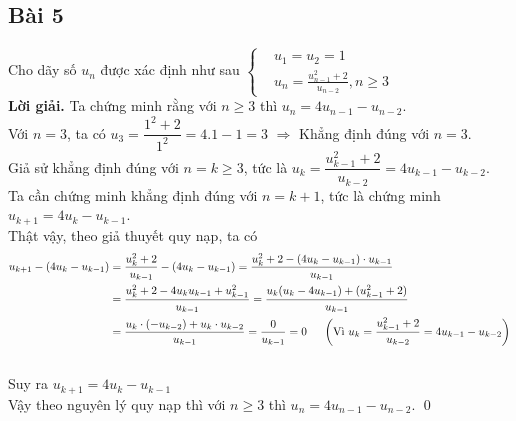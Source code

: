 \documentclass[a4paper,14pt]{article}
\begin{document}
    \subsection{Bài 5}
        Cho dãy số $u_n$ được xác định như sau  \(
                                                    \left\{
                                                        \begin{aligned}
                                                            &u_1=u_2=1
                                                            \\&u_n=\frac{u_{n-1}^2+2}{u_{n-2}}, n\geqslant 3
                                                        \end{aligned}
                                                    \right.
                                                \)
        \\
        \textbf{Lời giải.}
            Ta chứng minh rằng với $n\geqslant 3$ thì $u_n=4u_{n-1}-u_{n-2}$. \\
            Với $n=3$, ta có $u_3=\dfrac{1^2+2}{1^2}=4.1-1=3$ $\Rightarrow$ Khẳng định đúng với $n=3$. \\
            Giả sử khẳng định đúng với $n=k\geqslant 3$, tức là $u_k=\dfrac{u_{k-1}^2+2}{u_{k-2}}=4u_{k-1}-u_{k-2}$. \\
            Ta cần chứng minh khẳng định đúng với $n=k+1$, tức là chứng minh $u_{k+1}=4u_k-u_{k-1}$. \\
            Thật vậy, theo giả thuyết quy nạp, ta có
                \begin{align*}
                    u_{k+1}-(4u_k-u_{k-1})&=\frac{u_k^2+2}{u_{k-1}}-(4u_k-u_{k-1})
                    =\frac{u_k^2+2-(4u_k-u_{k-1})\cdot u_{k-1}}{u_{k-1}}
                    \\&=\frac{u_k^2+2-4u_ku_{k-1}+u_{k-1}^2}{u_{k-1}}
                    =\frac{u_k(u_k-4u_{k-1})+(u_{k-1}^2+2)}{u_{k-1}}
                    \\&=\frac{u_k\cdot(-u_{k-2})+u_k\cdot u_{k-2}}{u_{k-1}}=\frac{0}{u_{k-1}}=0 
                    \hspace{0.5cm}\left(\text{Vì }u_k=\dfrac{u_{k-1}^2+2}{u_{k-2}}=4u_{k-1}-u_{k-2}\right)
                \end{align*}
                \\
                Suy ra $u_{k+1}=4u_k-u_{k-1}$ \\
                Vậy theo nguyên lý quy nạp thì với $n\geqslant 3$ thì $u_n=4u_{n-1}-u_{n-2}$.
        \qed
        \\
\end{document}
